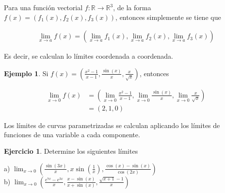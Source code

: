 \documentclass{article}
\theoremstyle{plain}
\theoremstyle{definition}
\newtheorem{ejem}[thm]{Ejemplo}
\newtheorem{ejer}[thm]{Ejercicio}
\begin{document}
 Para una función vectorial $f: \mathbb{R} \to \mathbb{R}^3$, de la forma $f(x)= (f_1(x),f_2(x),f_3(x))$, entonces simplemente se tiene que

 \begin{align*}
     \lim_{x \to a} f(x) = \left(\lim_{x \to a} f_1(x), \lim_{x \to a} f_2(x), \lim_{x \to a} f_3(x) \right)
 \end{align*}

Es decir, se calculan lo límites coordenada a coordenada. \\

\begin{ejem}Si $f(x) = \displaystyle \left( \frac{x^2-1}{x-1}, \frac{\sin(x)}{x}, \frac{x}{\sqrt{x}}\right)$, entonces
\end{ejem}

\begin{align*}
    \lim_{x \to 0} f(x) &= \left(\lim_{x \to 0} \frac{x^2-1}{x-1},  \lim_{x \to 0} \frac{\sin(x)}{x}, \lim_{x \to 0} \frac{x}{\sqrt{x}} \right) \\
    &= (2,1,0)
\end{align*}

Los límites de curvas parametrizadas se calculan aplicando los límites de funciones de una variable a cada componente. \\


\begin{ejer}Determine los siguientes l\'imites\\
\end{ejer}

a) $\displaystyle \lim_{x \to 0} \left( \frac{\sin(3x)}{x}, x\sin \left(\frac{1}{x}\right), \frac{\cos(x)-\sin(x)}{\cos(2x)}\right)$ \\


b) $\displaystyle \lim_{x \to 0} \left( \frac{e^{7x}-e^{3x}}{x}, \frac{x-\sin(x)}{x+\sin(x)}, \frac{\sqrt{x+1}-1}{x}\right)$ \\
\end{document}
